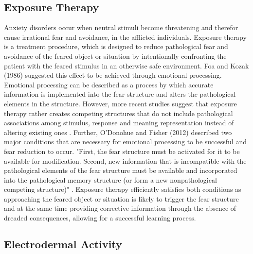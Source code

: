\subsection{Exposure Therapy}\label{EXPEP}
Anxiety disorders occur when neutral stimuli become threatening and therefor cause irrational fear and avoidance, in the afflicted individuals. Exposure therapy is a treatment procedure, which is designed to reduce pathological fear and avoidance of the feared object or situation by intentionally confronting the patient with the feared stimulus in an otherwise safe environment. Foa and Kozak (1986) suggested this effect to be achieved through emotional processing. Emotional processing can be described as a process by which accurate information is implemented into the fear structure and alters the pathological elements in the structure. However, more recent studies suggest that exposure therapy rather creates competing structures that do not include pathological associations among stimulus, response and meaning representation instead of altering existing ones \cite{o2012cognitive}. Further, O'Donohue and Fisher (2012) described two major conditions that are necessary for emotional processing to be successful and fear reduction to occur. "First, the fear structure must be activated for it to be available for modification. Second, new information that is incompatible with the pathological elements of the fear structure must be available and incorporated into the pathological memory structure (or form a new nonpathological competing structure)" \cite{o2012cognitive}. Exposure therapy efficiently satisfies both conditions as approaching the feared object or situation is likely to trigger the fear structure and at the same time  providing corrective information through the absence of dreaded consequences, allowing for a successful learning process.

\subsection{Electrodermal Activity}
%

